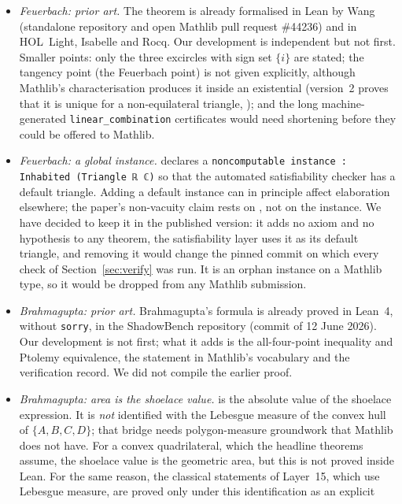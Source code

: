 \documentclass[11pt]{article}
\theoremstyle{definition}
\theoremstyle{remark}
\newcommand{\lean}[1]{\texttt{#1}}
\begin{document}
\begin{itemize}
\item \emph{Feuerbach: prior art.} The theorem is already formalised in Lean by Wang
(standalone repository and open Mathlib pull request \#44236) and in HOL~Light, Isabelle and Rocq.
Our development is independent but not first. Smaller points: only the three excircles with sign
set $\{i\}$ are stated; the tangency point (the Feuerbach point) is not given explicitly, although
Mathlib's characterisation produces it inside an existential (version~2 proves that it is unique for a
non-equilateral triangle, ); and the long machine-generated
\lean{linear\_combination} certificates would need shortening before they could be offered to
Mathlib.
\item \emph{Feuerbach: a global instance.}  declares a
\lean{noncomputable instance : Inhabited (Triangle ℝ ℂ)} so that the automated satisfiability
checker has a default triangle. Adding a default instance can in principle affect elaboration
elsewhere; the paper's non-vacuity claim rests on , not on the
instance. We have decided to keep it in the published version: it adds no axiom and no hypothesis
to any theorem, the satisfiability layer uses it as its default triangle, and removing it would
change the pinned commit on which every check of Section~\ref{sec:verify} was run. It is an orphan
instance on a Mathlib type, so it would be dropped from any Mathlib submission.
\item \emph{Brahmagupta: prior art.} Brahmagupta's formula is already proved in Lean~4, without
\lean{sorry}, in the ShadowBench repository (commit of 12 June 2026). Our development is not first;
what it adds is the all-four-point inequality and Ptolemy equivalence, the statement in Mathlib's
vocabulary and the verification record. We did not compile the earlier proof.
\item \emph{Brahmagupta: area is the shoelace value.}  is the absolute
value of the shoelace expression. It is \emph{not} identified with the Lebesgue measure of the
convex hull of $\{A,B,C,D\}$; that bridge needs polygon-measure groundwork that Mathlib does not
have. For a convex quadrilateral, which the headline theorems assume, the shoelace value is the
geometric area, but this is not proved inside Lean. For the same reason, the classical statements of
Layer~15, which use Lebesgue measure, are proved only under this identification as an explicit

\end{itemize}
\end{document}
